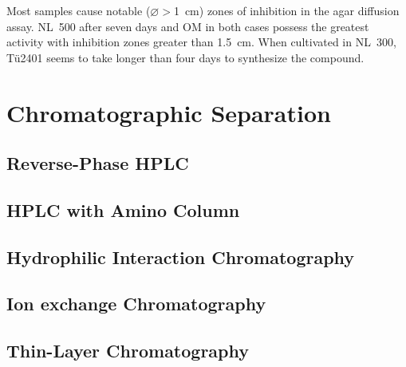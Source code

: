 Most samples cause notable ($\varnothing>$\SI{1}{\centi\meter}) zones of inhibition in the agar diffusion assay. NL~500 after seven days and OM in both cases possess the greatest activity with inhibition zones greater than \SI{1.5}{\centi\meter}. When cultivated in NL~300, Tü2401 seems to take longer than four days to synthesize the compound.

\section{Chromatographic Separation} %
\label{sec:results_chromatographic_separation}

    \subsection{Reverse-Phase HPLC} %
    \label{sub:results_reverse_phase_hplc}


    \subsection{HPLC with Amino Column} %
    \label{sub:results_hplc_with_amino_column}


    \subsection{Hydrophilic Interaction Chromatography} %
    \label{sub:results_hydrophilic_interaction_chromatography}


    \subsection{Ion exchange Chromatography} %
    \label{sub:results_ion_exchange_chromatography}


    \subsection{Thin-Layer Chromatography} %
    \label{sub:results_thin_layer_chromatography}

